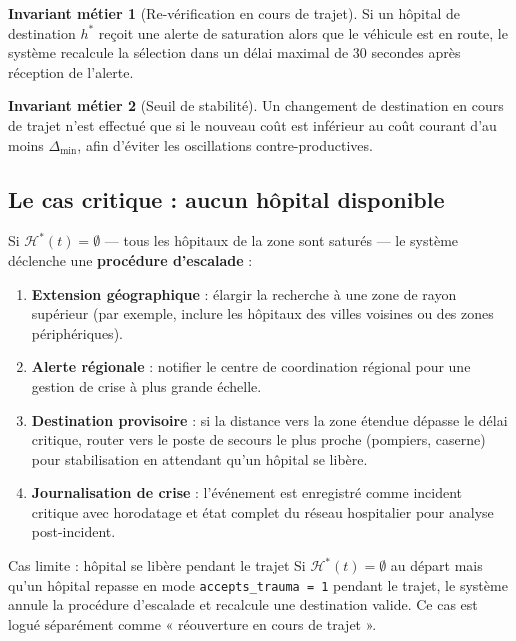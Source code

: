 \documentclass[12pt,a4paper]{article}
\theoremstyle{definition}
\newtheorem{invariant}{Invariant métier}[section]
\theoremstyle{remark}
\begin{document}
\begin{invariant}[Re-vérification en cours de trajet]
Si un hôpital de destination $h^*$ reçoit une alerte de saturation
alors que le véhicule est en route, le système recalcule la sélection
dans un délai maximal de 30 secondes après réception de l'alerte.
\end{invariant}

\begin{invariant}[Seuil de stabilité]
Un changement de destination en cours de trajet n'est effectué que si
le nouveau coût est inférieur au coût courant d'au moins $\Delta_{\min}$,
afin d'éviter les oscillations contre-productives.
\end{invariant}

\subsection{Le cas critique : aucun hôpital disponible}
\label{subsec:escalade}

Si $\mathcal{H}^*(t) = \emptyset$ — tous les hôpitaux de la zone sont
saturés — le système déclenche une \textbf{procédure d'escalade} :

\begin{enumerate}[leftmargin=2em, itemsep=4pt]
  \item \textbf{Extension géographique} : élargir la recherche à une
    zone de rayon supérieur (par exemple, inclure les hôpitaux
    des villes voisines ou des zones périphériques).
  \item \textbf{Alerte régionale} : notifier le centre de coordination
    régional pour une gestion de crise à plus grande échelle.
  \item \textbf{Destination provisoire} : si la distance vers la
    zone étendue dépasse le délai critique, router vers le poste
    de secours le plus proche (pompiers, caserne) pour stabilisation
    en attendant qu'un hôpital se libère.
  \item \textbf{Journalisation de crise} : l'événement est enregistré
    comme incident critique avec horodatage et état complet du
    réseau hospitalier pour analyse post-incident.
\end{enumerate}

\begin{alertbox}{Cas limite : hôpital se libère pendant le trajet}
Si $\mathcal{H}^*(t) = \emptyset$ au départ mais qu'un hôpital repasse
en mode \texttt{accepts\_trauma = 1} pendant le trajet, le système
annule la procédure d'escalade et recalcule une destination valide.
Ce cas est logué séparément comme « réouverture en cours de trajet ».
\end{alertbox}
\end{document}

